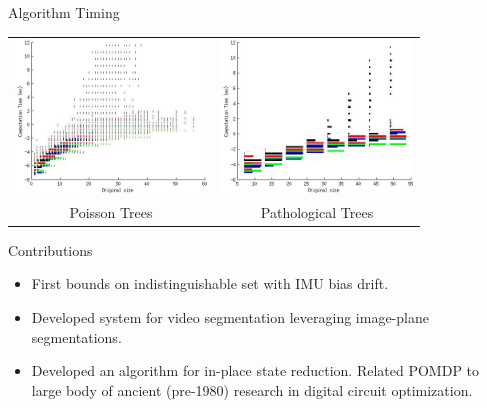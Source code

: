 \begin{tframe}{Algorithm Timing}
\begin{center}
\begin{tabular}{cc}
\includegraphics[width=2in]{media_minrep/poiss_time}&
\includegraphics[width=2in]{media_minrep/patho_time}\\
Poisson Trees &
Pathological Trees
\end{tabular}
\end{center}
\end{tframe}

\begin{tframe}{Contributions}
 \begin{itemize}
  \item First bounds on indistinguishable set with IMU bias drift.
  \item Developed system for video segmentation leveraging image-plane segmentations.
  \item Developed an algorithm for in-place state reduction. Related POMDP to large body of ancient (pre-1980) research in digital circuit optimization.
 \end{itemize}
\end{tframe}
